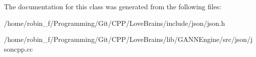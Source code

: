 The documentation for this class was generated from the following files\+:\begin{DoxyCompactItemize}
\item 
/home/robin\+\_\+f/\+Programming/\+Git/\+C\+P\+P/\+Love\+Brains/include/json/json.\+h\item 
/home/robin\+\_\+f/\+Programming/\+Git/\+C\+P\+P/\+Love\+Brains/lib/\+G\+A\+N\+N\+Engine/src/json/jsoncpp.\+cc\end{DoxyCompactItemize}
